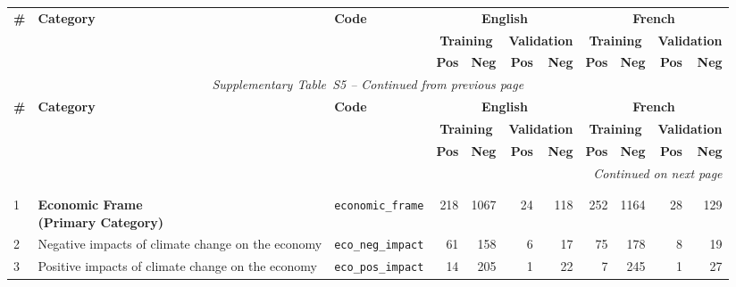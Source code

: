 \label{tab:training_distribution_s5}
\begin{longtable}{p{0.5cm}p{4.0cm}p{3.0cm}rrrrrrrr}
\toprule
\multirow{3}{*}{\textbf{\#}} & \multirow{3}{*}{\textbf{Category}} & \multirow{3}{*}{\textbf{Code}} & \multicolumn{4}{c}{\textbf{English}} & \multicolumn{4}{c}{\textbf{French}} \\
\cmidrule(lr){4-7} \cmidrule(lr){8-11}
& & & \multicolumn{2}{c}{\textbf{Training}} & \multicolumn{2}{c}{\textbf{Validation}} & \multicolumn{2}{c}{\textbf{Training}} & \multicolumn{2}{c}{\textbf{Validation}} \\
\cmidrule(lr){4-5} \cmidrule(lr){6-7} \cmidrule(lr){8-9} \cmidrule(lr){10-11}
& & & \textbf{Pos} & \textbf{Neg} & \textbf{Pos} & \textbf{Neg} & \textbf{Pos} & \textbf{Neg} & \textbf{Pos} & \textbf{Neg} \\
\midrule
\endfirsthead
\multicolumn{11}{c}{\textit{Supplementary Table~S5 -- Continued from previous page}} \\
\toprule
\multirow{3}{*}{\textbf{\#}} & \multirow{3}{*}{\textbf{Category}} & \multirow{3}{*}{\textbf{Code}} & \multicolumn{4}{c}{\textbf{English}} & \multicolumn{4}{c}{\textbf{French}} \\
\cmidrule(lr){4-7} \cmidrule(lr){8-11}
& & & \multicolumn{2}{c}{\textbf{Training}} & \multicolumn{2}{c}{\textbf{Validation}} & \multicolumn{2}{c}{\textbf{Training}} & \multicolumn{2}{c}{\textbf{Validation}} \\
\cmidrule(lr){4-5} \cmidrule(lr){6-7} \cmidrule(lr){8-9} \cmidrule(lr){10-11}
& & & \textbf{Pos} & \textbf{Neg} & \textbf{Pos} & \textbf{Neg} & \textbf{Pos} & \textbf{Neg} & \textbf{Pos} & \textbf{Neg} \\
\midrule
\endhead
\midrule
\multicolumn{11}{r}{\textit{Continued on next page}} \\
\endfoot
\bottomrule
\endlastfoot
\multicolumn{11}{l}{\cellcolor{gray!10}\textbf{MAIN FRAMES}} \\
\midrule
\rowcolor{gray!8}
\multicolumn{11}{l}{\textit{Economic Frame}} \\
\midrule
1 & \textbf{Economic Frame\newline (Primary Category)} & \texttt{economic\_frame} & 218 & 1067 & 24 & 118 & 252 & 1164 & 28 & 129 \\
\cmidrule(lr){1-11}
2 & Negative impacts of climate change on the economy & \texttt{eco\_neg\_impact} & 61 & 158 & 6 & 17 & 75 & 178 & 8 & 19 \\
3 & Positive impacts of climate change on the economy & \texttt{eco\_pos\_impact} & 14 & 205 & 1 & 22 & 7 & 245 & 1 & 27 \\

\end{longtable}
